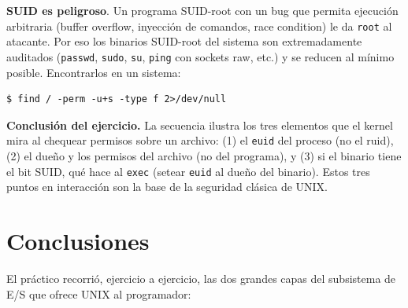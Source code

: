 \documentclass[11pt,a4paper]{article}
\begin{document}
\begin{center}
\end{center}

\begin{importante}
\textbf{SUID es peligroso}. Un programa SUID-root con un bug que
permita ejecución arbitraria (buffer overflow, inyección de
comandos, race condition) le da \texttt{root} al atacante. Por eso
los binarios SUID-root del sistema son extremadamente auditados
(\texttt{passwd}, \texttt{sudo}, \texttt{su}, \texttt{ping} con
sockets raw, etc.) y se reducen al mínimo posible. Encontrarlos en un
sistema:

\begin{lstlisting}[style=shellstyle]
$ find / -perm -u+s -type f 2>/dev/null
\end{lstlisting}
\end{importante}

\textbf{Conclusión del ejercicio.} La secuencia ilustra los tres
elementos que el kernel mira al chequear permisos sobre un archivo:
(1) el \texttt{euid} del proceso (no el ruid), (2) el dueño y los
permisos del archivo (no del programa), y (3) si el binario tiene el
bit SUID, qué hace al \texttt{exec} (setear \texttt{euid} al dueño del
binario). Estos tres puntos en interacción son la base de la
seguridad clásica de UNIX.

\section{Conclusiones}

El práctico recorrió, ejercicio a ejercicio, las dos grandes capas del
subsistema de E/S que ofrece UNIX al programador:
\end{document}
